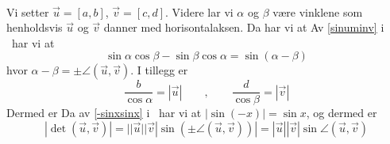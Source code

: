  \\
Vi setter $ \vec{u}=[a, b] $, $ \vec{v}=[c, d] $. Videre lar vi $ \alpha $ og $\beta $ være vinklene som henholdsvis $ \vec{u} $ og $ \vec{v} $ danner med horisontalaksen. Da har vi at
Av \eqref{sinuminv} i \tmto\ har vi at
\[ \sin \alpha \cos \beta-\sin \beta \cos\alpha = \sin(\alpha-\beta) \]
hvor $ \alpha-\beta=\pm \angle(\vec{u}, \vec{v}) $. I tillegg er 
\[ \frac{b}{\cos \alpha}=|\vec{u}|\qquad,\qquad\frac{d}{\cos \beta}=|\vec{v}| \]
Dermed er
Da av \eqref{-sinxsinx} i \tmto\ har vi at $ |\sin (-x)|=\sin x $, og dermed er
\[|\det(\vec{u}, \vec{v})|= ||\vec{u}||\vec{v}|\sin(\pm \angle(\vec{u}, \vec{v}))|=|\vec{u}||\vec{v}|\sin \angle(\vec{u}, \vec{v}) \]



